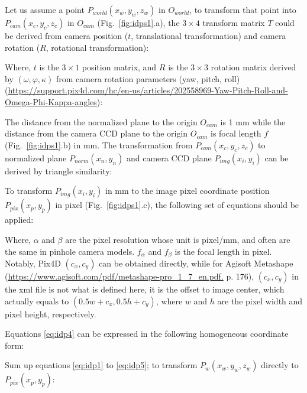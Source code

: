 Let us assume a point $P_{world} (x_w,y_w,z_w)$ in $O_{world}$, to transform that point into $P_{cam} (x_c,y_c,z_c)$ in $O_{cam}$ (Fig.~\ref{fig:idps1}.a), the $3\times4$ transform matrix $T$ could be derived from camera position ($t$, translational transformation) and camera rotation ($R$, rotational transformation):



\noindent 
Where, $t$ is the $3\times1$ position matrix, and $R$ is the $3\times3$ rotation matrix derived by $(\omega, \varphi, \kappa)$ from camera rotation parameters (yaw, pitch, roll) (\url{https://support.pix4d.com/hc/en-us/articles/202558969-Yaw-Pitch-Roll-and-Omega-Phi-Kappa-angles}):

% 

The distance from the normalized plane to the origin $O_{cam}$  is 1 mm while the distance from the camera CCD plane to the origin $O_{cam}$ is focal length $f$ (Fig.~\ref{fig:idps1}.b) in mm. The transformation from $P_{cam}(x_c,y_c,z_c)$ to normalized plane $P_{norm} (x_n,y_n)$ and camera CCD plane $P_{img} (x_i,y_i)$ can be derived by triangle similarity:



To transform $P_{img} (x_i,y_i)$ in mm to the image pixel coordinate position $P_{pix} (x_p,y_p)$ in pixel (Fig.~\ref{fig:idps1}.c), the following set of equations should be applied:



\noindent 
Where, $\alpha$ and $\beta$ are the pixel resolution whose unit is pixel/mm, and often are the same in pinhole camera models. $f_{\alpha}$ and $f_{\beta}$ is the focal length in pixel. Notably, Pix4D $(c_x,c_y)$ can be obtained directly, while for Agisoft Metashape (\url{https://www.agisoft.com/pdf/metashape-pro_1_7_en.pdf.} p. 176), $(c_x,c_y)$ in the xml file is not what is defined here, it is the offset to image center, which actually equals to $(0.5w+c_x,0.5h+c_y)$, where $w$ and $h$ are the pixel width and pixel height, respectively.

Equations \eqref{eq:idp4} can be expressed in the following homogeneous coordinate form: 



Sum up equations \eqref{eq:idp1} to \eqref{eq:idp5}; to transform $P_w (x_w,y_w,z_w)$ directly to $P_{pix} (x_p,y_p)$:



